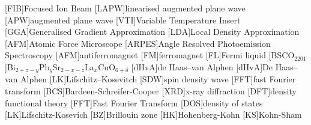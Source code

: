 
[FIB]{Focused Ion Beam}
[LAPW]{linearised augmented plane wave}
[APW]{augmented plane wave}
[VTI]{Variable Temperature Insert}
[GGA]{Generalised Gradient Approximation}
[LDA]{Local Density Approximation}
[AFM]{Atomic Force Microscope}
[ARPES]{Angle Resolved Photoemission Spectroscopy}
[AFM]{antiferromagnet}
[FM]{ferromagnet}
[FL]{Fermi liquid}
[BSCO$_{2201}$]{Bi$_{2+z-y}$Pb$_{y}$Sr$_{2-x-z}$La$_{x}$CuO$_{6+\delta}$}
[dHvA]{de Haas--van Alphen}
[dHvA]{De Haas--van Alphen}
[LK]{Lifschitz--Kosevitch}
[SDW]{spin density wave}
[FFT]{fast Fourier transform}
[BCS]{Bardeen-Schreifer-Cooper}
[XRD]{x-ray diffraction}
[DFT]{density functional theory}
[FFT]{Fast Fourier Transform}
[DOS]{density of states}
[LK]{Lifschitz-Kosevich}
[BZ]{Brillouin zone}
[HK]{Hohenberg-Kohn}
[KS]{Kohn-Sham}


